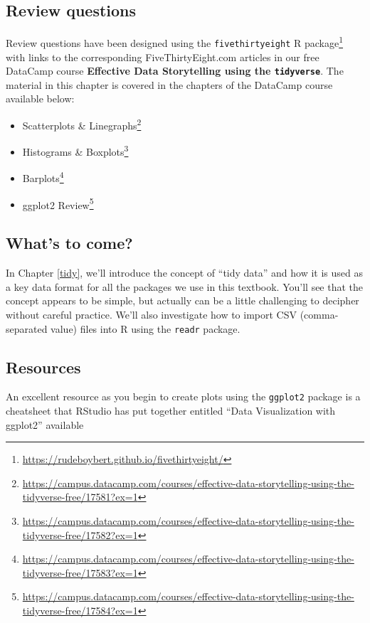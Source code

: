 \documentclass[12pt,]{krantz}
\providecommand{\tightlist}{%
  \setlength{\itemsep}{0pt}\setlength{\parskip}{0pt}}
\renewcommand{\href}[2]{#2\footnote{\url{#1}}}
\theoremstyle{definition}
\theoremstyle{definition}
\theoremstyle{definition}
\theoremstyle{remark}
\begin{document}
\subsection{Review questions}\label{review-questions}

Review questions have been designed using the
\href{https://rudeboybert.github.io/fivethirtyeight/}{\texttt{fivethirtyeight}
R package} \citep{R-fivethirtyeight} with links to the corresponding
FiveThirtyEight.com articles in our free DataCamp course
\textbf{Effective Data Storytelling using the \texttt{tidyverse}}. The
material in this chapter is covered in the chapters of the DataCamp
course available below:

\begin{itemize}
\tightlist
\item
  \href{https://campus.datacamp.com/courses/effective-data-storytelling-using-the-tidyverse-free/17581?ex=1}{Scatterplots
  \& Linegraphs}
\item
  \href{https://campus.datacamp.com/courses/effective-data-storytelling-using-the-tidyverse-free/17582?ex=1}{Histograms
  \& Boxplots}
\item
  \href{https://campus.datacamp.com/courses/effective-data-storytelling-using-the-tidyverse-free/17583?ex=1}{Barplots}
\item
  \href{https://campus.datacamp.com/courses/effective-data-storytelling-using-the-tidyverse-free/17584?ex=1}{ggplot2
  Review}
\end{itemize}

\subsection{What's to come?}\label{whats-to-come-1}

In Chapter \ref{tidy}, we'll introduce the concept of ``tidy data'' and
how it is used as a key data format for all the packages we use in this
textbook. You'll see that the concept appears to be simple, but actually
can be a little challenging to decipher without careful practice. We'll
also investigate how to import CSV (comma-separated value) files into R
using the \texttt{readr} package.

\subsection{Resources}\label{resources}

An excellent resource as you begin to create plots using the
\texttt{ggplot2} package is a cheatsheet that RStudio has put together
entitled ``Data Visualization with ggplot2'' available
\end{document}
